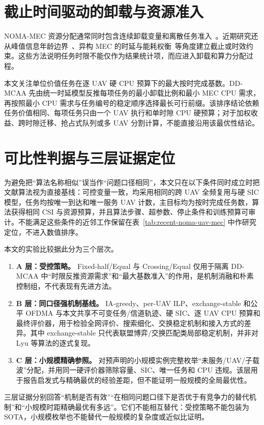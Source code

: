 \section{截止时间驱动的卸载与资源准入}
NOMA-MEC 资源分配通常同时包含连续卸载变量和离散任务准入~\cite{ding2019impact,zhu2022multi}。近期研究还从峰值信息年龄边界~\cite{chen2024peakaoi}、异构 MEC 的时延与能耗权衡~\cite{islam2025delta}等角度建立截止或时效约束。这些方法说明任务时限不能仅作为结果统计项，而应进入卸载和算力分配过程。

本文关注单位价值任务在逐 UAV 硬 CPU 预算下的最大按时完成基数。DD-MCAA 先由统一时延模型反推每项任务的最小卸载比例和最小 MEC CPU 需求，再按照最小 CPU 需求与任务编号的稳定顺序选择最长可行前缀。该排序结论依赖任务价值相同、每项任务只由一个 UAV 执行和单时隙 CPU 硬预算；对于加权收益、跨时隙迁移、抢占式队列或多 UAV 分割计算，不能直接沿用该最优性结论。

\section{可比性判据与三层证据定位}
为避免把“算法名称相似”误当作“问题口径相同”，本文只在以下条件同时成立时把文献算法视为直接基线：可控变量一致，均采用相同的跨 UAV 全频复用与硬 SIC 模型，任务均按唯一到达和唯一服务 UAV 计数，主目标均为按时完成任务数，算法获得相同 CSI 与资源预算，并且算法步骤、超参数、停止条件和训练预算可审计。不能满足这些条件的近邻工作保留在表~\ref{tab:recent-noma-uav-mec} 中作研究定位，不进入数值排序。

本文的实验比较据此分为三个层次。

\begin{enumerate}
  \item \textbf{A 层：受控策略。} Fixed-half/Equal 与 Crossing/Equal 仅用于隔离 DD-MCAA 中“时限反推资源需求”和“最大基数准入”的作用，是机制消融和朴素控制组，不代表现有先进方法。
  \item \textbf{B 层：同口径强机制基线。} IA-greedy、per-UAV ILP、exchange-stable 和公平 OFDMA 与本文共享不可变任务/信道轨迹、硬 SIC、逐 UAV CPU 预算和最终评价器，用于检验全网评价、搜索细化、交换稳定机制和接入方式的差异。其中 exchange-stable 只代表联盟博弈/交换匹配类局部稳定机制，并非对 Lyu 等算法的逐式复现。
  \item \textbf{C 层：小规模精确参照。} 对预声明的小规模实例完整枚举“未服务/UAV/子载波”分配，并用同一硬评价器筛除容量、SIC、唯一任务和 CPU 违规。该层用于报告启发式与精确最优的经验差距，但不能证明一般规模的全局最优性。
\end{enumerate}

三层证据分别回答“机制是否有效”“在相同问题口径下是否优于有竞争力的替代机制”和“小规模时距精确最优有多远”。它们不能相互替代：受控策略不能包装为 SOTA，小规模枚举也不能替代一般规模的复杂度或近似比证明。

